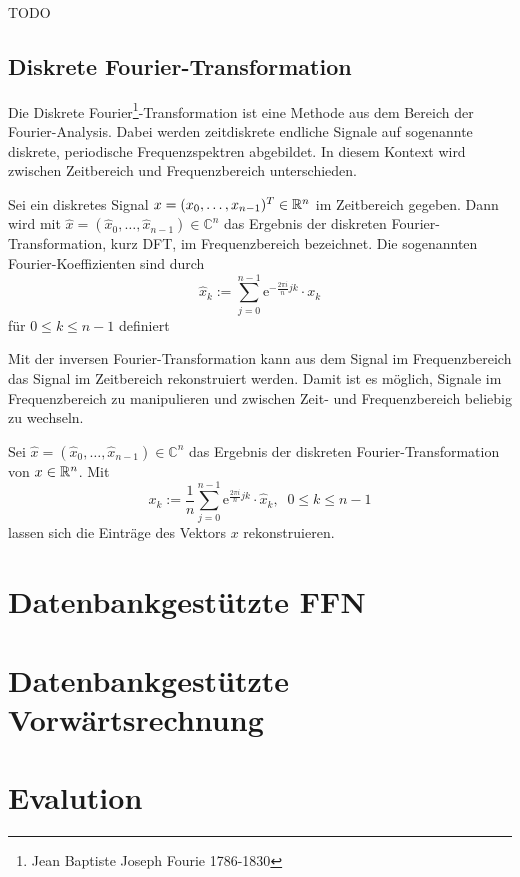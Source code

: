 \begin{bsp}
    \label{bsp:Kzeropad}
    TODO
\end{bsp}

\subsection{Diskrete Fourier-Transformation}
Die Diskrete Fourier\footnote{Jean Baptiste Joseph Fourie 1786-1830}-Transformation ist eine Methode aus dem Bereich der Fourier-Analysis. Dabei werden zeitdiskrete endliche Signale auf sogenannte diskrete, periodische Frequenzspektren abgebildet. In diesem Kontext wird zwischen Zeitbereich und Frequenzbereich unterschieden.

\begin{defi}
    Sei ein diskretes Signal $x=(x_0, \ldots, x_{n-1})^T \in \mathbb{R}^n$ im Zeitbereich gegeben. Dann wird mit $\hat{x}=(\hat{x}_0, \ldots, \hat{x}_{n-1}) \in \mathbb{C}^n$ das Ergebnis der diskreten Fourier-Transformation, kurz DFT, im Frequenzbereich bezeichnet. Die sogenannten Fourier-Koeffizienten sind durch 
    \begin{equation*}
        \hat{x}_k:=\sum_{j=0}^{n-1} \mathrm{e}^{- \frac{2 \pi i}{n} j k} \cdot x_k
    \end{equation*}
    für $0 \leq k \leq n-1$ definiert
\end{defi}
Mit der inversen Fourier-Transformation kann aus dem Signal im Frequenzbereich das Signal im Zeitbereich rekonstruiert werden. Damit ist es möglich, Signale im Frequenzbereich zu manipulieren und zwischen Zeit- und Frequenzbereich beliebig zu wechseln.
\begin{defi}
    Sei $\hat{x}=(\hat{x}_0, \ldots, \hat{x}_{n-1}) \in \mathbb{C}^n$ das Ergebnis der diskreten Fourier-Transformation von $x \in \mathbb{R}^n$. Mit 
    \begin{equation*}
        x_k:= \frac{1}{n} \sum_{j=0}^{n-1} \mathrm{e}^{\frac{2 \pi i}{n} j k} \cdot \hat{x}_k, \; \; 0 \leq k \leq n-1
    \end{equation*}
    lassen sich die Einträge des Vektors $x$ rekonstruieren.
\end{defi}
\section{Datenbankgestützte FFN}
\label{abs:FFN_in_sql}
\section{Datenbankgestützte Vorwärtsrechnung}
\label{abs_CNN_in_SQL}
\section{Evalution}
\label{abs:CNN_eval}